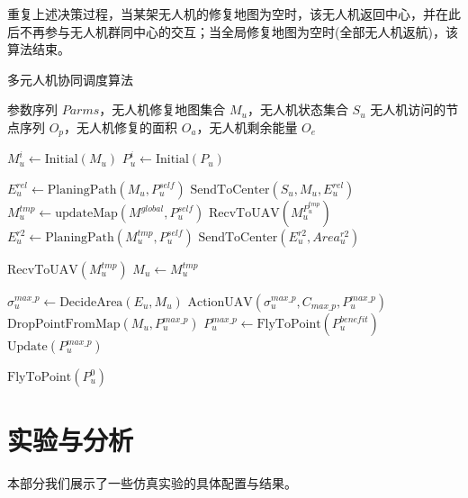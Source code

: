\documentclass[AutoFakeBold]{LZUThesis}
\begin{document}
重复上述决策过程，当某架无人机的修复地图为空时，该无人机返回中心，并在此后不再参与无人机群同中心的交互；当全局修复地图为空时(全部无人机返航)，该算法结束。

\begin{algorithm}[H]
	\caption{多元人机协同调度算法}
	\label{alg:multi_uav_scheduling}
	\begin{algorithmic}[1]
		\Require 参数序列 $Parms$，无人机修复地图集合 $M_u$，无人机状态集合 $S_u$
		\Ensure 无人机访问的节点序列 $O_p$，无人机修复的面积 $O_a$，无人机剩余能量 $O_e$

		\State $M_u^i \gets \text{Initial}(M_u)$ 
		\State $P_u^i \gets \text{Initial}(P_u)$ 

		\State $E_u^{rel} \gets \text{PlaningPath}(M_u, P_u^{self})$ 
		\State $\text{SendToCenter}(S_u, M_u, E_u^{rel})$ 
		\State $M_u^{tmp} \gets \text{updateMap}(M^{global}, P_u^{self})$ 
		\State $\text{RecvToUAV}(M_u^{P_u^{tmp}})$ 
		\State $E_u^{r2} \gets \text{PlaningPath}(M_u^{tmp}, P_u^{self})$ 
		\State $\text{SendToCenter}(E_u^{r2}, Area_u^{r2})$ 

		\State $\text{RecvToUAV}(M_u^{tmp})$ 
		\State $M_u \gets M_u^{tmp}$
		\EndIf

		\State $\sigma_u^{max\_p} \gets \text{DecideArea}(E_u, M_u)$ 
		\State $\text{ActionUAV}(\sigma_u^{max\_p}, C_{max\_p}, P_u^{max\_p})$ 
		\State $\text{DropPointFromMap}(M_u, P_u^{max\_p})$
		\State $P_u^{max\_p} \gets \text{FlyToPoint}(P_u^{benefit})$ 
		\State $\text{Update}(P_u^{max\_p})$ 
		\EndWhile

		\State $\text{FlyToPoint}(P_u^0)$ 
	\end{algorithmic}
\end{algorithm}


\chapter{实验与分析}
本部分我们展示了一些仿真实验的具体配置与结果。
\label{sub:实验配置表格}
\end{document}
